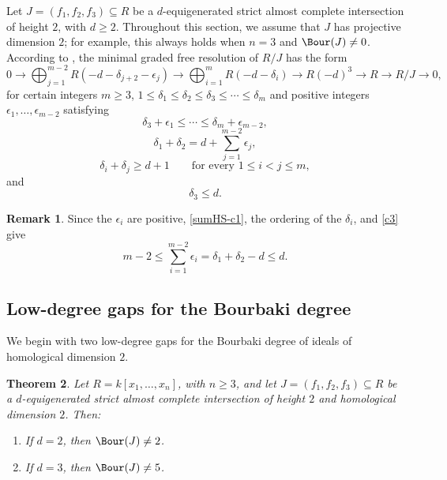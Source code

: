 \documentclass[11pt]{amsart} %
\newtheorem{Theorem}{Theorem}[section]
\theoremstyle{definition}
\newtheorem{Remark}[Theorem]{Remark}
\begin{document}
Let $J=(f_1,f_2,f_3)\subseteq R$ be a $d$-equigenerated strict almost
complete intersection of height $2$, with $d\ge2$. Throughout this
section, we assume that $J$ has projective dimension $2$; for example,
this always holds when $n=3$ and $\Bour(J)\neq0$. According to
\cite{BFRS}, the minimal graded free resolution of $R/J$ has the form
\begin{equation}\label{res-prelim-bis}
0\to
\bigoplus_{j=1}^{m-2}R(-d-\delta_{j+2}-\epsilon_j)
\to
\bigoplus_{i=1}^{m}R(-d-\delta_i)
\to R(-d)^3\to R\to R/J\to0,
\end{equation}
for certain integers $m\ge3$,
$1\le\delta_1\le\delta_2\le\delta_3\le\cdots\le\delta_m$ and positive integers $\epsilon_1,\ldots,\epsilon_{m-2}$ satisfying
\begin{equation}\label{Dnondecresing}
\delta_3+\epsilon_1\le\cdots\le\delta_m+\epsilon_{m-2},
\end{equation}
\begin{equation}\label{sumHS-c1}
\delta_1+\delta_2
=d+\sum_{j=1}^{m-2}\epsilon_j,
\end{equation}
\begin{equation}\label{c2}
\delta_i+\delta_j\ge d+1
\qquad\text{for every }1\le i<j\le m,
\end{equation}
and
\begin{equation}\label{c3}
\delta_3\le d.
\end{equation}

\begin{Remark}\label{numberofsyzygies}
Since the $\epsilon_i$ are positive, \eqref{sumHS-c1}, the ordering of
the $\delta_i$, and \eqref{c3} give
\[
m-2
\le\sum_{i=1}^{m-2}\epsilon_i
=\delta_1+\delta_2-d
\le d.
\]
\end{Remark}

\subsection{Low-degree gaps for the Bourbaki degree}

We begin with two low-degree gaps for the Bourbaki degree of ideals of
homological dimension $2$.

\begin{Theorem}\label{low-degree-gap}
Let $R=k[x_1,\ldots,x_n]$, with $n\ge3$, and let
$J=(f_1,f_2,f_3)\subseteq R$ be a $d$-equigenerated strict almost
complete intersection of height $2$ and homological dimension $2$. Then:
\begin{enumerate}
\item[{\rm(a)}] If $d=2$, then $\Bour(J)\neq2$.
\item[{\rm(b)}] If $d=3$, then $\Bour(J)\neq5$.
\end{enumerate}
\end{Theorem}
\end{document}
